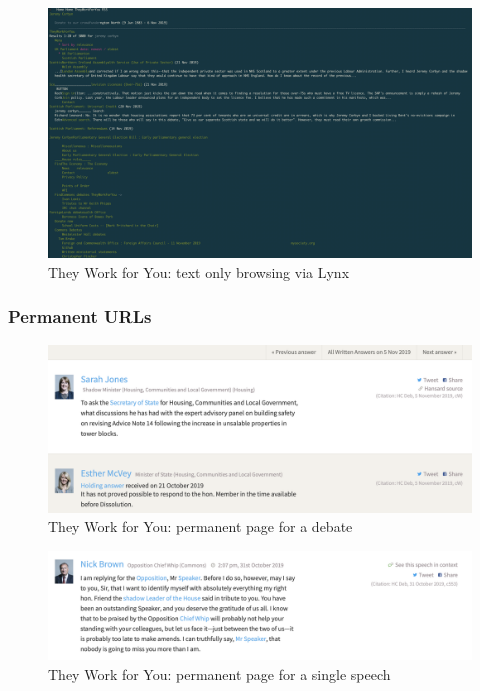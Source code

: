 \documentclass{article}
\begin{document}
			\begin{figure}
				\centering
				\includegraphics[scale=0.15]{images/they-work-for-you-implementation-text-only-lynx}
				\caption{They Work for You: text only browsing via Lynx}
				\label{fig:they-work-for-you-implementation-text-only-lynx}
			\end{figure}

        	\subsubsection*{Permanent URLs}
        	 
        	
			\begin{figure}
				\centering
				\includegraphics[scale=0.5]{images/they-work-for-you-implementation-permanent-urls-1}
				\caption{They Work for You: permanent page for a debate}
				\label{fig:/they-work-for-you-implementation-permanent-urls-1}
			\end{figure}

			\begin{figure}
				\centering
				\includegraphics[scale=0.3]{images/they-work-for-you-implementation-permanent-urls-2}
				\caption{They Work for You: permanent page for a single speech}
				\label{fig:they-work-for-you-implementation-permanent-urls-2}
			\end{figure}
\end{document}

